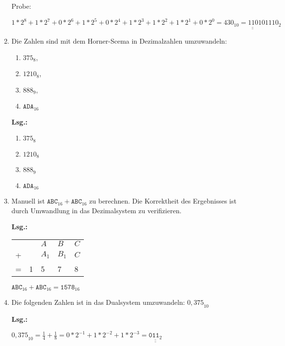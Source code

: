 \documentclass[12pt,a4paper]{scrreprt}
\newcommand{\Lsg}{\par \textbf{Lsg.: \hfill }}
\newcommand{\lsg}[1]{\underline{\underline{#1}}}
\begin{document}
\begin{enumerate}
Probe:

\begin{math}
 1*2^8
+1*2^7
+0*2^6
+1*2^5
+0*2^4
+1*2^3
+1*2^2
+1*2^1
+0*2^0
= \lsg{
	430_{10} = {110101110}_{2}
}
\end{math}


\item Die Zahlen sind mit dem Horner-Scema in Dezimalzahlen umzuwandeln: \begin{enumerate}
\item $375_8$,
\item $1210_8$,
\item $888_9$,
\item $\texttt{ADA}_{16}$
\end{enumerate}

\Lsg

\begin{enumerate}
\item $375_8$
\item $1210_8$
\item $888_9$
\item $\texttt{ADA}_{16}$
\end{enumerate}%

\item Manuell ist $\texttt{ABC}_{16} + \texttt{ABC}_{16}$ zu berechnen. Die Korrektheit des Ergebnisses ist durch Umwandlung in das Dezimalsystem zu verifizieren.

\Lsg

\begin{tabular}{lllll}
  & & $A$ & $B$ & $C$ \\
+ & & $A_{1}$ & $B_{1}$ & $C$ \\
\hline 
= & 1 & 5 & 7 & 8
\end{tabular}

$\texttt{ABC}_{16} + \texttt{ABC}_{16} = \texttt{1578}_{16}$

\item Die folgenden Zahlen ist in das Dualsystem umzuwandeln: ${0,375}_{10}$

\Lsg

\begin{math}
{0,375}_{10} = 
\frac{1}{4} + \frac{1}{8} 
 = 0*2^{-1} + 1*2^{-2} + 1*2^{-3} = \lsg{
	\texttt{011}_{2}
}
\end{math}


\end{enumerate}
\end{document}
